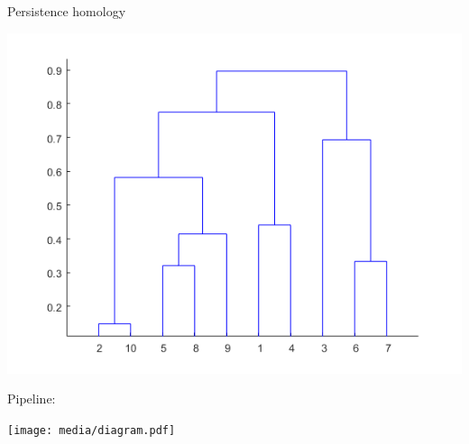 \documentclass[10pt,t, handout]{beamer} %
\begin{document}
\begin{frame}{Persistence homology}
	\begin{center}
		\includegraphics[scale=.2]{media/dendogram}
	\end{center}

	\pause
	\vskip -10pt

	\textcolor{pblue}{Pipeline:}
	\begin{center}
		\texttt{[image: media/diagram.pdf]}
	\end{center}
\end{frame}
\end{document}

